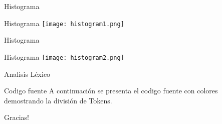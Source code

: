 \documentclass[10pt,xcolor={dvipsnames}]{beamer}
\begin{document}
        \begin{frame}{Histograma}
        \begin{alertblock}{Histograma}
            \texttt{[image: histogram1.png]}
            \end{alertblock}
        \end{frame}

        \begin{frame}{Histograma}
        \begin{alertblock}{Histograma}
            \texttt{[image: histogram2.png]}
            \end{alertblock}
        \end{frame}
        
        
        \begin{frame}{Analisis Léxico}
        \begin{alertblock}{Codigo fuente}
            A continuación se presenta el codigo fuente con colores demostrando la división de Tokens.
            \end{alertblock}
        \end{frame}


    


    {
        \begin{frame}[standout]
            \begin{center}
              Gracias!
            \end{center}
        \end{frame}
    }
\end{document}
